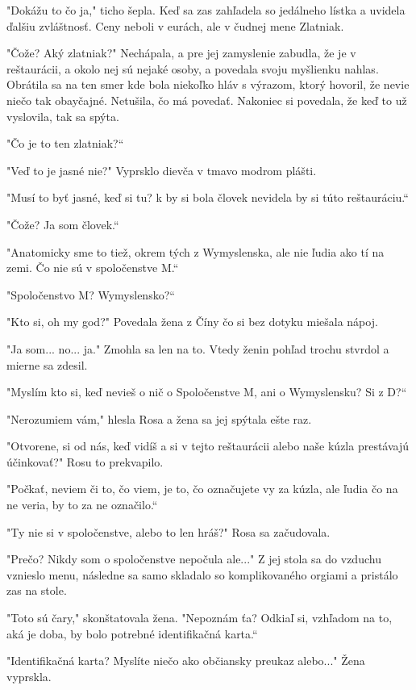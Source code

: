 \documentclass{book}
\begin{document}
"$ $Dokážu to čo ja,"$ $ ticho šepla. Keď sa zas zahľadela so jedálneho lístka a uvidela ďalšiu zvláštnosť. Ceny neboli v eurách, ale v čudnej mene Zlatniak.

"$ $Čože? Aký zlatniak?"$ $ Nechápala, a pre jej zamyslenie zabudla, že je v reštaurácii, a okolo nej sú nejaké osoby, a povedala svoju myšlienku nahlas. Obrátila sa na ten smer kde bola niekoľko hláv s výrazom, ktorý hovoril, že nevie niečo tak obayčajné. Netušila, čo má povedať. Nakoniec si povedala, že keď to už vyslovila, tak sa spýta.

"$ $Čo je to ten zlatniak?“

"$ $Veď to je jasné nie?"$ $ Vyprsklo dievča v tmavo modrom plášti.

"$ $Musí to byť jasné, keď si tu? k by si bola človek nevidela by si túto reštauráciu.“

"$ $Čože? Ja som človek.“

"$ $Anatomicky sme to tiež, okrem tých z Wymyslenska, ale nie ľudia ako tí na zemi. Čo nie sú v spoločenstve M.“

"$ $Spoločenstvo M? Wymyslensko?“

"$ $Kto si, oh my god?"$ $ Povedala žena z Číny čo si bez dotyku miešala nápoj.

"$ $Ja som... no... ja."$ $ Zmohla sa len na to. Vtedy ženin pohľad trochu stvrdol a mierne sa zdesil.

"$ $Myslím kto si, keď nevieš o nič o Spoločenstve M, ani o Wymyslensku? Si z D?“

"$ $Nerozumiem vám,"$ $ hlesla Rosa a žena sa jej spýtala ešte raz.

"$ $Otvorene, si od nás, keď vidíš a si v tejto reštaurácii alebo naše kúzla prestávajú účinkovať?"$ $ Rosu to prekvapilo.

"$ $Počkať, neviem či to, čo viem, je to, čo označujete vy za kúzla, ale ľudia čo na ne veria, by to za ne označilo.“

"$ $Ty nie si v spoločenstve, alebo to len hráš?"$ $ Rosa sa začudovala.

"$ $Prečo? Nikdy som o spoločenstve nepočula ale..."$ $ Z jej stola sa do vzduchu vznieslo menu, následne sa samo skladalo so komplikovaného orgiami a pristálo zas na stole.

"$ $Toto sú čary,"$ $ skonštatovala žena. "$ $Nepoznám ťa? Odkiaľ si, vzhľadom na to, aká je doba, by bolo potrebné identifikačná karta.“

"$ $Identifikačná karta? Myslíte niečo ako občiansky preukaz alebo..."$ $ Žena vyprskla.
\end{document}
